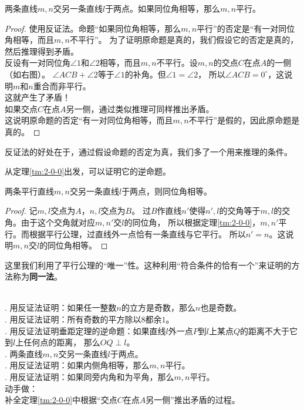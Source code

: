 \documentclass[12pt,UTF8]{ctexbook}
\begin{document}
\begin{tm}\label{tm:2-0-0}
    两条直线$m,n$交另一条直线$l$于两点。如果同位角相等，那么$m,n$平行。
\end{tm}
\begin{proof}
    使用反证法。命题“如果同位角相等，那么$m,n$平行”的否定是“有一对同位角相等，而且$m,n$不平行”。
    为了证明原命题是真的，我们假设它的否定是真的，然后推理得到矛盾。\\
    反设有一对同位角$\angle 1$和$\angle 2$相等，而且$m,n$不平行。设$m,n$的交点$C$在点$A$的一侧（如右图）。
    $\angle ACB + \angle 2$等于$\angle 1$的补角。但$\angle 1 = \angle 2$，
    所以$\angle ACB = 0^\circ$，这说明$m$和$n$重合而非平行。\\
    这就产生了矛盾！\\
    如果交点$C$在点$A$另一侧，通过类似推理可同样推出矛盾。\\
    这说明原命题的否定“有一对同位角相等，而且$m,n$不平行”是假的，因此原命题是真的。
\end{proof}

反证法的好处在于，通过假设命题的否定为真，我们多了一个用来推理的条件。

从定理\ref{tm:2-0-0}出发，可以证明它的逆命题。

\begin{tm}\label{tm:2-0-10}
    两条平行直线$m,n$交另一条直线$l$于两点，则同位角相等。
\end{tm}

\begin{proof}
    记$m,l$交点为$A$，$n,l$交点为$B$。
    过$B$作直线$n'$使得$n',l$的交角等于$m,l$的交角。由于这个交角就对应$m,n'$交$l$的同位角，
    所以根据定理\ref{tm:2-0-0}，$m,n'$平行。而根据平行公理，过直线外一点恰有一条直线与它平行。
    所以$n' = n$。这说明$m,n$交$l$的同位角相等。
\end{proof}

这里我们利用了平行公理的“唯一”性。这种利用“符合条件的恰有一个”来证明的方法称为\textbf{同一法}。

\begin{xt}
    \mbox{} \\
    . 用反证法证明：如果任一整数$n$的立方是奇数，那么$n$也是奇数。\\
    . 用反证法证明：所有奇数的平方除以$8$都余$1$。\\
    . 用反证法证明垂距定理的逆命题：如果直线$l$外一点$P$到$l$上某点$Q$的距离不大于它到$l$上任何点的距离，
    那么$OQ \perp l$。\\
    . 两条直线$m,n$交另一条直线$l$于两点。\\
    . 用反证法证明：如果内侧角相等，那么$m,n$平行。\\
    . 用反证法证明：如果同旁内角和为平角，那么$m,n$平行。\\
    动手做：\\
    \indent 补全定理\ref{tm:2-0-0}中根据“交点$C$在点$A$另一侧”推出矛盾的过程。
\end{xt}
\end{document}
